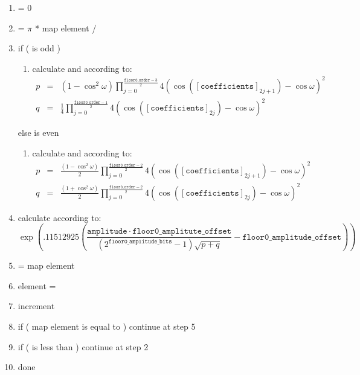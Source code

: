 \begin{enumerate}
 \item  \varname{[i]} = 0
 \item  \varname{[$\omega$]} = $\pi$ * map element \varname{[i]} / 
 \item if (  is odd ) {
  \begin{enumerate}
   \item calculate \varname{[p]} and \varname{[q]} according to:
           \begin{eqnarray*}
             p & = & (1 - \cos^2\omega)\prod_{j=0}^{\frac{\mathtt{floor0\_order}-3}{2}} 4 (\cos([\mathtt{coefficients}]_{2j+1}) - \cos \omega)^2 \\
             q & = & \frac{1}{4} \prod_{j=0}^{\frac{\mathtt{floor0\_order}-1}{2}} 4 (\cos([\mathtt{coefficients}]_{2j}) - \cos \omega)^2
           \end{eqnarray*}

  \end{enumerate}
  } else  is even {
  \begin{enumerate}
   \item calculate \varname{[p]} and \varname{[q]} according to:
           \begin{eqnarray*}
             p & = & \frac{(1 - \cos^2\omega)}{2} \prod_{j=0}^{\frac{\mathtt{floor0\_order}-2}{2}} 4 (\cos([\mathtt{coefficients}]_{2j+1}) - \cos \omega)^2 \\
             q & = & \frac{(1 + \cos^2\omega)}{2} \prod_{j=0}^{\frac{\mathtt{floor0\_order}-2}{2}} 4 (\cos([\mathtt{coefficients}]_{2j}) - \cos \omega)^2
           \end{eqnarray*}

  \end{enumerate}
  }

 \item calculate  according to:
         \begin{displaymath}
           \exp \left( .11512925 \left(\frac{\mathtt{amplitude} \cdot \mathtt{floor0\_amplitute\_offset}}{(2^{\mathtt{floor0\_amplitude\_bits}}-1)\sqrt{p+q}}
                  - \mathtt{floor0\_amplitude\_offset} \right) \right)
         \end{displaymath}

 \item {} = map element \varname{[i]}
 \item \varname{[output]} element \varname{[i]} = 
 \item increment \varname{[i]}
 \item if ( map element \varname{[i]} is equal to  ) continue at step 5
 \item if ( \varname{[i]} is less than \varname{[n]} ) continue at step 2
 \item done
\end{enumerate}







